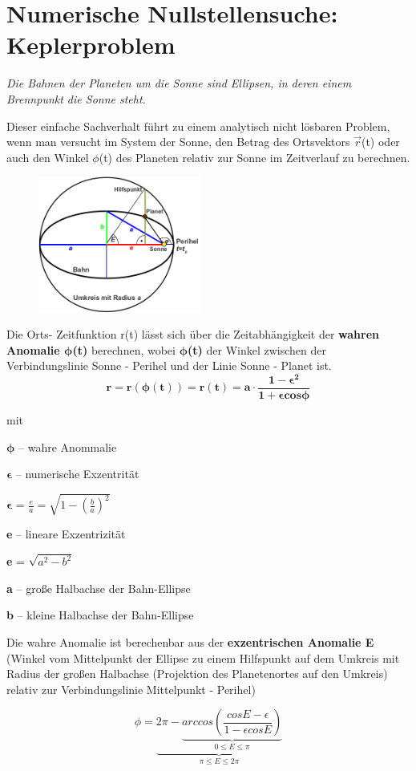 \documentclass{scrartcl}	    %
\begin{document}

\section*{Numerische Nullstellensuche: Keplerproblem}
\emph{Die Bahnen der Planeten um die Sonne sind Ellipsen, in deren einem Brennpunkt die Sonne steht.}

Dieser einfache Sachverhalt führt zu einem analytisch nicht lösbaren Problem, wenn man versucht im System der Sonne, den Betrag des Ortsvektors $\vec{r}$(t) oder auch den Winkel $\phi$(t) des Planeten relativ zur Sonne im Zeitverlauf zu berechnen.

\begin{figure}
\includegraphics[width=0.48\textwidth]{Kepler_Schema.png}
\end{figure}

Die Orts- Zeitfunktion r(t) lässt sich über
die Zeitabhängigkeit der \textbf{wahren Anomalie
$\boldsymbol{\phi}$(t)} berechnen, wobei $\boldsymbol{\phi}$\textbf{(t)} der Winkel zwischen der Verbindungslinie Sonne - Perihel und der Linie Sonne - Planet ist.
\[
\mathbf{ r = r(\boldsymbol{\phi} (t)) = r(t) = a \cdot \frac{1-\boldsymbol{\epsilon}^2}{1+\boldsymbol{\epsilon} cos \boldsymbol{\phi}}}
\]

mit

\begin{description}
\item $\boldsymbol{\phi}$ -- wahre Anommalie
\item $\boldsymbol{\epsilon}$ -- numerische Exzentrität
\item $\boldsymbol{\epsilon}$ = $\frac{e}{a} = \sqrt{1-{(\frac{b}{a})}^2}$
\item \textbf{e} -- lineare Exzentrizität
\item \textbf{e} = $\sqrt{a^2 - b^2}$
\item \textbf{a} -- große Halbachse der Bahn-Ellipse
\item \textbf{b} -- kleine Halbachse der Bahn-Ellipse
\end{description}
Die wahre Anomalie ist berechenbar aus der \textbf{exzentrischen Anomalie E} (Winkel vom Mittelpunkt der Ellipse zu einem Hilfspunkt auf dem Umkreis mit Radius der großen Halbachse (Projektion des Planetenortes auf den Umkreis) relativ zur Verbindungslinie Mittelpunkt - Perihel)

\[
\phi = \underbrace{2\pi - \underbrace{arccos(\frac{cos E-\epsilon}{1-\epsilon cos E})}_{0 \le E \le \pi}}_{\pi \le E \le 2\pi}
\]
\end{document}
